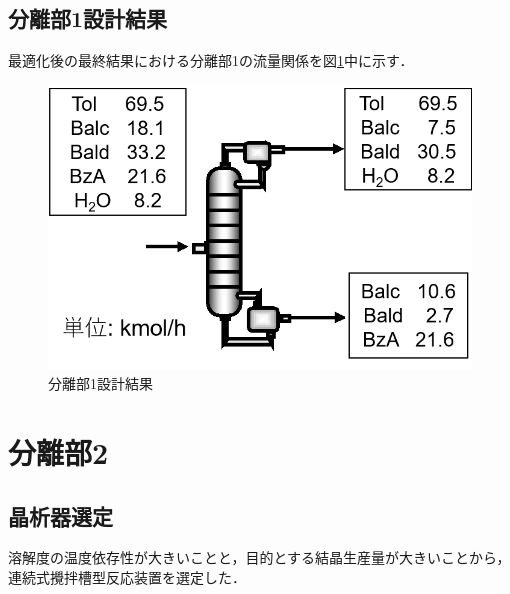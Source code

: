 \documentclass[a4j]{jsreport}
\begin{document}
\section{分離部1設計結果}
最適化後の最終結果における分離部1の流量関係を図\ref{分離部1設計結果の図}中に示す．
\begin{figure}[htbp]
  \centering
  \includegraphics[scale=0.7]{Separation1Conclusion.png}
  \caption{分離部1設計結果}
  \label{分離部1設計結果の図}
\end{figure}


\clearpage
\chapter{分離部2}
\section{晶析器選定}
溶解度の温度依存性が大きいことと，目的とする結晶生産量が大きいことから，
連続式攪拌槽型反応装置を選定した．
\end{document}
